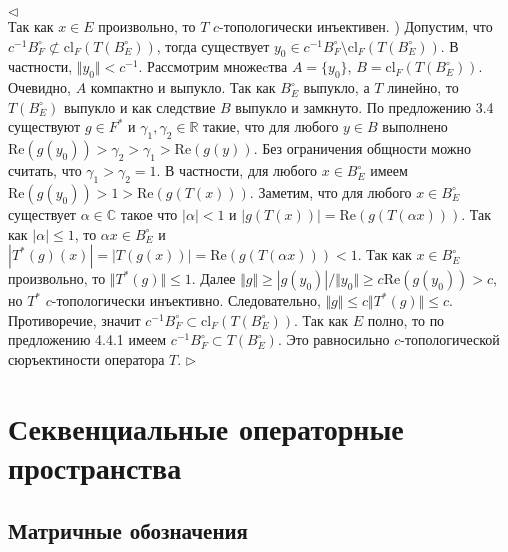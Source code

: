 \documentclass[12pt]{article}
\newenvironment{proof}{\par $\triangleleft$}{$\triangleright$}
\begin{document}
\begin{proof}
$$$$
Так как $x\in E$ произвольно, то $ T$ $c$-топологически инъективен.
) Допустим, что $c^{-1}B_F^\circ\not\subset\mathrm{cl}_F( T(B_E^\circ))$, тогда существует $y_0\in c^{-1}B_F^\circ\setminus\mathrm{cl}_F( T(B_E^\circ))$. В частности, $\Vert y_0\Vert<c^{-1}$. Рассмотрим множеcтва $A=\{y_0\}$, 
$B=\mathrm{cl}_F( T(B_E^\circ))$. Очевидно, $A$ компактно и выпукло. Так как $B_E^\circ$ выпукло, а $ T$ линейно, то $ T(B_E^\circ)$ выпукло и как следствие $B$ выпукло и замкнуто. По предложению 
3.4 \cite{RudinFA} существуют $g\in F^*$ и $\gamma_1,\gamma_2\in\mathbb{R}$ такие, что для любого $y\in B$ выполнено $\mathrm{Re}(g(y_0))>\gamma_2>\gamma_1>\mathrm{Re}(g(y))$. Без ограничения общности 
можно считать, что $\gamma_1>\gamma_2=1$. В частности, для любого $x\in B_E^\circ$ имеем $\mathrm{Re}(g(y_0))>1>\mathrm{Re}(g( T(x)))$. Заметим, что для любого $x\in B_E^\circ$ существует $\alpha\in\mathbb{C}$ 
такое что $|\alpha|<1$ и $|g( T(x))|=\mathrm{Re}(g(T(\alpha x)))$. Так как $|\alpha|\leq 1$, то $\alpha x\in B_E^\circ$ и $| T^*(g)(x)|=| T(g(x))|=\mathrm{Re}(g( T(\alpha x)))<1$. Так как $x\in B_E^\circ$ 
произвольно, то $\Vert T^*(g)\Vert\leq 1$. Далее $\Vert g\Vert\geq|g(y_0)|/\Vert y_0\Vert\geq c\mathrm{Re}(g(y_0))>c$, но $ T^*$ $c$-топологически инъективно. Следовательно, 
$\Vert g\Vert\leq c\Vert T^*(g)\Vert\leq c$. Противоречие, значит $c^{-1}B_F^\circ\subset \mathrm{cl}_F( 
T(B_E^\circ))$. Так как $E$ полно, то по предложению 4.4.1 \cite{HelFA} имеем $c^{-1}B_F^\circ\subset T(B_E^\circ)$. Это равносильно $c$-топологической сюръектиности оператора $T$.
\end{proof}

























\section{Секвенциальные операторные пространства}

\subsection {Матричные обозначения}
\end{document}
